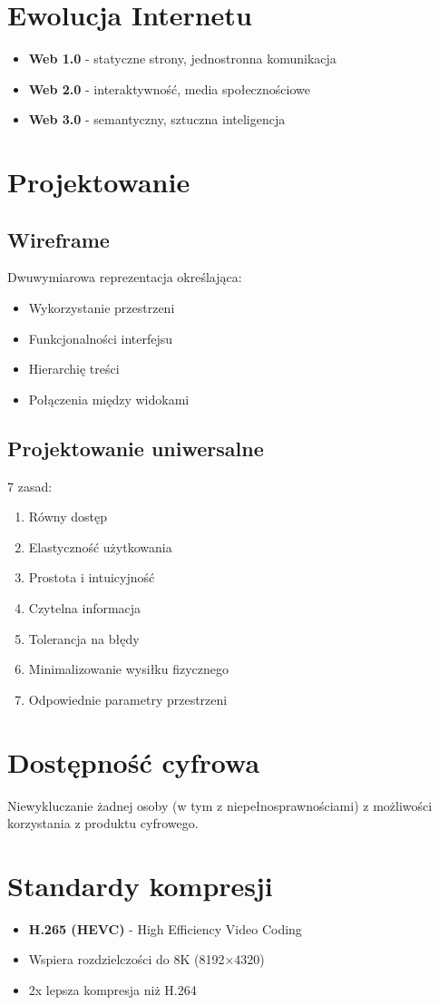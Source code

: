 \documentclass[11pt,a4paper]{article}
\begin{document}
\section{Ewolucja Internetu}
\begin{itemize}[noitemsep]
    \item \textbf{Web 1.0} - statyczne strony, jednostronna komunikacja
    \item \textbf{Web 2.0} - interaktywność, media społecznościowe
    \item \textbf{Web 3.0} - semantyczny, sztuczna inteligencja
\end{itemize}

\section{Projektowanie}
\subsection{Wireframe}
Dwuwymiarowa reprezentacja określająca:
\begin{itemize}[noitemsep]
    \item Wykorzystanie przestrzeni
    \item Funkcjonalności interfejsu
    \item Hierarchię treści
    \item Połączenia między widokami
\end{itemize}

\subsection{Projektowanie uniwersalne}
7 zasad:
\begin{enumerate}[noitemsep]
    \item Równy dostęp
    \item Elastyczność użytkowania
    \item Prostota i intuicyjność
    \item Czytelna informacja
    \item Tolerancja na błędy
    \item Minimalizowanie wysiłku fizycznego
    \item Odpowiednie parametry przestrzeni
\end{enumerate}

\section{Dostępność cyfrowa}
Niewykluczanie żadnej osoby (w tym z niepełnosprawnościami) z możliwości korzystania z produktu cyfrowego.

\section{Standardy kompresji}
\begin{itemize}[noitemsep]
    \item \textbf{H.265 (HEVC)} - High Efficiency Video Coding
    \item Wspiera rozdzielczości do 8K (8192×4320)
    \item 2x lepsza kompresja niż H.264
\end{itemize}
\end{document}
